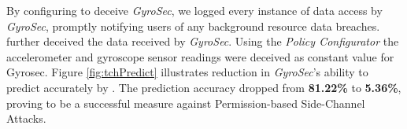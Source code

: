 By configuring \framework{} to deceive \textit{GyroSec}, we logged every instance of data access by \textit{GyroSec}, promptly notifying users of any background resource data breaches. \framework{} further deceived the data received by \textit{GyroSec}. Using the \textit{Policy Configurator} the accelerometer and gyroscope sensor readings were deceived as constant value for Gyrosec.
Figure \ref{fig:tchPredict} illustrates reduction in \textit{GyroSec}'s ability to predict accurately by \framework{}. The prediction accuracy dropped from \textbf{81.22\%} to \textbf{5.36\%}, proving \framework{} to be a successful measure against Permission-based Side-Channel Attacks.

